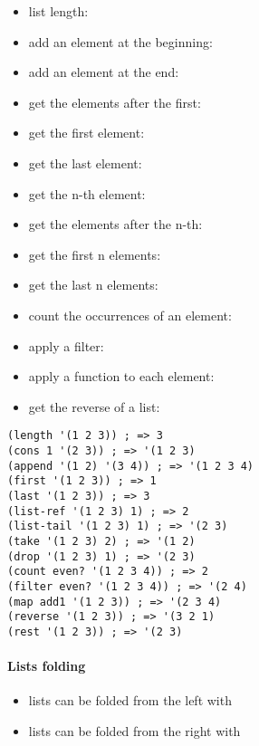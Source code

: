 \documentclass[a4paper,landscape,10pt]{article}
\begin{document}
\begin{multicols*}{2}
  \begin{itemize}
    \item list length: 
    \item add an element at the beginning: 
    \item add an element at the end: 
    \item get the elements after the first: 
    \item get the first element: 
    \item get the last element: 
    \item get the n-th element: 
    \item get the elements after the n-th: 
    \item get the first n elements: 
    \item get the last n elements: 
    \item count the occurrences of an element: 
    \item apply a filter: 
    \item apply a function to each element: 
    \item get the reverse of a list: 
  \end{itemize}

  \begin{lstlisting}[language=Racket]
(length '(1 2 3)) ; => 3
(cons 1 '(2 3)) ; => '(1 2 3)
(append '(1 2) '(3 4)) ; => '(1 2 3 4)
(first '(1 2 3)) ; => 1
(last '(1 2 3)) ; => 3
(list-ref '(1 2 3) 1) ; => 2
(list-tail '(1 2 3) 1) ; => '(2 3)
(take '(1 2 3) 2) ; => '(1 2)
(drop '(1 2 3) 1) ; => '(2 3)
(count even? '(1 2 3 4)) ; => 2
(filter even? '(1 2 3 4)) ; => '(2 4)
(map add1 '(1 2 3)) ; => '(2 3 4)
(reverse '(1 2 3)) ; => '(3 2 1)
(rest '(1 2 3)) ; => '(2 3)
\end{lstlisting}

  \paragraph{Lists folding}

  \begin{itemize}
    \item lists can be folded from the left with 
    \item lists can be folded from the right with 
  \end{itemize}


\end{multicols*}
\end{document}
